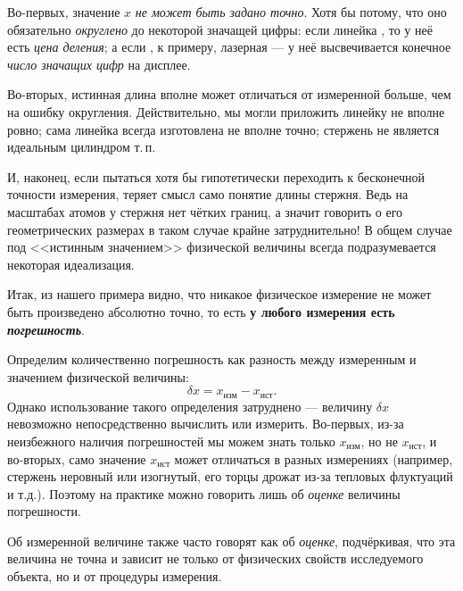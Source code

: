 Во-первых, значение $x$ \emph{не может быть задано точно}. Хотя бы
потому, что оно обязательно \emph{округлено} до некоторой значащей
цифры: если линейка , то у неё
есть \emph{цена деления}; а если , к примеру, лазерная
--- у неё высвечивается конечное \emph{число значащих цифр}
на дисплее.

Во-вторых, истинная длина вполне может отличаться от измеренной больше,
чем на ошибку округления. Действительно,
мы могли приложить линейку не вполне ровно; сама линейка всегда
изготовлена не вполне точно; стержень не является идеальным цилиндром т.\,п.

И, наконец, если пытаться хотя бы гипотетически переходить к бесконечной
точности измерения, теряет смысл само понятие  длины стержня. Ведь на масштабах атомов у стержня нет чётких границ, а значит говорить о его
геометрических размерах в таком случае крайне затруднительно! В общем случае 
под <<истинным значением>> физической величины всегда подразумевается 
некоторая идеализация.

Итак, из нашего примера видно, что никакое физическое измерение не может быть
произведено абсолютно точно, то есть
\textbf{у любого измерения есть \emph{погрешность}}.%

Определим количественно погрешность как разность между измеренным и  значением физической величины:
\[\delta x=x_{\text{изм}}-x_{\text{ист}}.\]
Однако использование такого определения затруднено ---
величину $\delta x$ невозможно непосредственно вычислить или измерить. Во-первых, из-за неизбежного наличия погрешностей мы можем знать только $x_{изм}$,
но не $x_{ист}$, и во-вторых, само значение $x_{ист}$ может отличаться в разных измерениях (например, стержень
неровный или изогнутый, его торцы дрожат из-за тепловых флуктуаций и т.д.).
Поэтому на практике можно говорить лишь об \emph{оценке} величины погрешности.

Об измеренной величине также часто говорят как об \emph{оценке}, подчёркивая,
что эта величина не точна и зависит не только от физических свойств
исследуемого объекта, но и от процедуры измерения.

